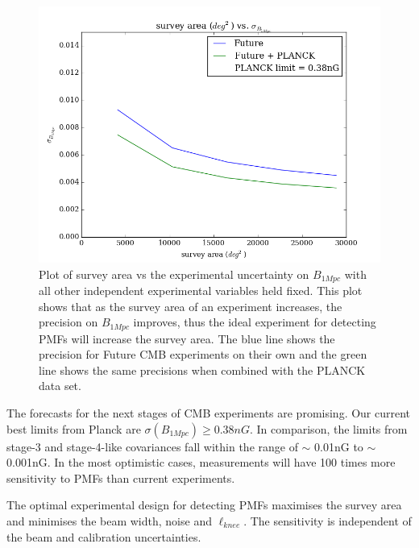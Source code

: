 \begin{figure}[h]
\centering
\includegraphics[scale=0.8]{images/area.png}
\caption{Plot of survey area vs the experimental uncertainty on $B_{1Mpc}$ with all other independent experimental variables held fixed. This plot shows that as the survey area of an experiment increases, the precision on $B_{1Mpc}$ improves, thus the ideal experiment for detecting PMFs will increase the survey area. The blue line shows the precision for Future CMB experiments on their own and the green line shows the same precisions when combined with the PLANCK data set.}
\label{fig:area}
\end{figure}

The forecasts for the next stages of CMB experiments are promising. Our current best limits from Planck are $\sigma(B_{1Mpc}) \geq 0.38nG$. In comparison, the limits from stage-3 and stage-4-like covariances fall within the range of $\sim$ 0.01nG to $\sim$ 0.001nG. In the most optimistic cases, measurements will have 100 times more sensitivity to PMFs than current experiments.

The optimal experimental design for detecting PMFs maximises the survey area and minimises the beam width, noise and $\ell_{knee}$. The sensitivity is independent of the beam and calibration uncertainties. 

